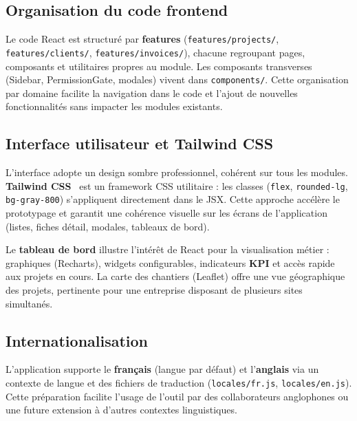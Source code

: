 \subsection{Organisation du code frontend}

Le code React est structuré par \textbf{features} (\texttt{features/projects/},
\texttt{features/clients/}, \texttt{features/invoices/}), chacune regroupant pages,
composants et utilitaires propres au module. Les composants transverses (Sidebar,
PermissionGate, modales) vivent dans \texttt{components/}. Cette organisation par
domaine facilite la navigation dans le code et l'ajout de nouvelles fonctionnalités
sans impacter les modules existants.

\subsection{Interface utilisateur et Tailwind CSS}

L'interface adopte un design sombre professionnel, cohérent sur tous les modules.
\textbf{Tailwind CSS}~\cite{tailwindcss} est un framework CSS utilitaire : les classes
(\texttt{flex}, \texttt{rounded-lg}, \texttt{bg-gray-800}) s'appliquent directement
dans le JSX. Cette approche accélère le prototypage et garantit une cohérence visuelle
sur les écrans de l'application (listes, fiches détail, modales, tableaux de bord).

\medskip

Le \textbf{tableau de bord} illustre l'intérêt de React pour la visualisation métier :
graphiques (Recharts), widgets configurables, indicateurs \textbf{KPI} et accès rapide
aux projets en cours. La carte des chantiers (Leaflet) offre une vue géographique des
projets, pertinente pour une entreprise disposant de plusieurs sites simultanés.

\subsection{Internationalisation}

L'application supporte le \textbf{français} (langue par défaut) et l'\textbf{anglais}
via un contexte de langue et des fichiers de traduction (\texttt{locales/fr.js},
\texttt{locales/en.js}). Cette préparation facilite l'usage de l'outil par des
collaborateurs anglophones ou une future extension à d'autres contextes linguistiques.
